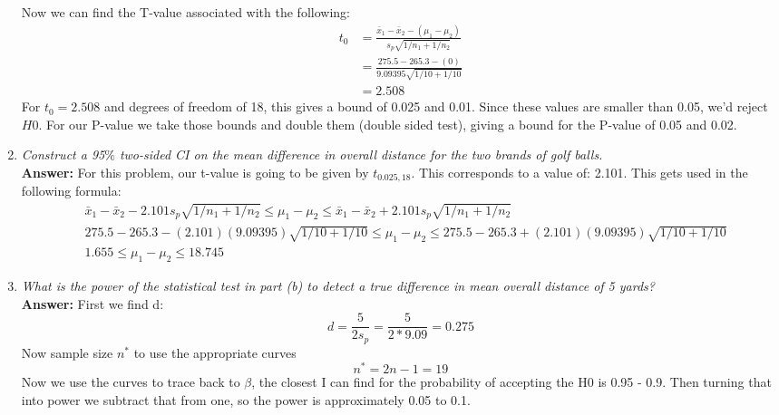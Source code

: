 \documentclass[11pt]{article}
\begin{document}
\begin{enumerate}
\begin{equation}
\end{equation}
Now we can find the T-value associated with the following:
\begin{equation}
\begin{split}
t_0 &= \frac{\bar{x}_1 - \bar{x}_2 - (\mu_1 - \mu_2)}{s_p\sqrt{1/n_1 + 1/n_2}} \\
&=\frac{275.5 - 265.3   - (0)}{9.09395\sqrt{1/10 + 1/10}} \\
&=2.508
\end{split}
\end{equation}
For $t_0 = 2.508$ and degrees of freedom of 18, this gives a bound of 0.025 and 0.01. Since these values are smaller than 0.05, we'd reject $H0$. For our P-value we take those bounds and double them (double sided test), giving a bound for the P-value of 0.05 and 0.02. 
\item \emph{Construct a 95$\%$ two-sided CI on the mean difference in overall distance for the two brands of golf balls.}
\\\textbf{Answer:}
For this problem, our t-value is going to be given by $t_{0.025, 18}$. This corresponds to a value of: 2.101. This gets used in the following formula:
\begin{equation}
\begin{split}
&\bar{x}_1 - \bar{x}_2 - 2.101s_p\sqrt{1/n_1 + 1/n_2} \leq \mu_1 - \mu_2 \leq \bar{x}_1 - \bar{x}_2 + 2.101s_p\sqrt{1/n_1 + 1/n_2}\\
&275.5 - 265.3 - (2.101) (9.09395)\sqrt{1/10 + 1/10} \leq \mu_1 - \mu_2 \leq 275.5 - 265.3 + (2.101) (9.09395)\sqrt{1/10 + 1/10}\\
&1.655 \leq \mu_1 - \mu_2 \leq 18.745
\end{split}
\end{equation}
\item \emph{What is the power of the statistical test in part (b) to detect a true difference in mean overall distance of 5 yards?}
\\\textbf{Answer:}
First we find d:
\begin{equation}
d = \frac{5}{2s_p} = \frac{5}{2*9.09} = 0.275
\end{equation}
Now sample size $n^*$ to use the appropriate curves
\begin{equation}
n^* = 2n - 1 = 19
\end{equation}
Now we use the curves to trace back to $\beta$, the closest I can find for the probability of accepting the H0 is 0.95 - 0.9. Then turning that into power we subtract that from one, so the power is approximately 0.05 to 0.1.

\end{enumerate}
\end{document}
